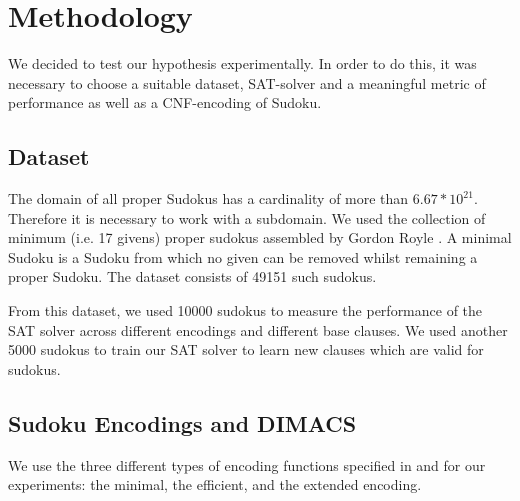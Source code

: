 \documentclass{article}
\begin{document}
\section{Methodology} \label{methods}

We decided to test our hypothesis experimentally. In order to do this, it was necessary to choose a suitable dataset, SAT-solver and a meaningful metric of performance as well as a CNF-encoding of Sudoku.

\subsection{Dataset}
The domain of all proper Sudokus has a cardinality of more than $6.67*10^21$. Therefore it is necessary to work with a subdomain. We used the collection of minimum (i.e. 17 givens) proper sudokus assembled by Gordon Royle \cite{sudokudataset}.  A minimal Sudoku is a Sudoku from which no given can be removed whilst remaining a proper Sudoku. The dataset consists of 49151 such sudokus. %

From this dataset, we used 10000 sudokus to measure the performance of the SAT solver across different encodings and different base clauses. We used another 5000 sudokus to train our SAT solver to learn new clauses which are valid for sudokus.

\subsection{Sudoku Encodings and DIMACS}

We use the three different types of encoding functions specified in \cite{sudokusat} and \cite{optimizedencoding} for our experiments: the minimal, the efficient, and the extended encoding.


\end{document}
